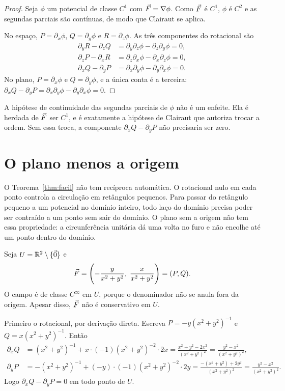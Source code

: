 \documentclass[11pt,a4paper]{article}
\begin{document}
\begin{proof}
Seja $\phi$ um potencial de classe $C^1$ com $\vec{F}=\nabla\phi$. Como $\vec{F}$ é $C^1$, $\phi$ é $C^2$ e as segundas parciais são contínuas, de modo que Clairaut se aplica.

No espaço, $P=\partial_x\phi$, $Q=\partial_y\phi$ e $R=\partial_z\phi$. As três componentes do rotacional são
\begin{align*}
\partial_y R-\partial_z Q
&=\partial_y\partial_z\phi-\partial_z\partial_y\phi=0,\\
\partial_z P-\partial_x R
&=\partial_z\partial_x\phi-\partial_x\partial_z\phi=0,\\
\partial_x Q-\partial_y P
&=\partial_x\partial_y\phi-\partial_y\partial_x\phi=0.
\end{align*}
No plano, $P=\partial_x\phi$ e $Q=\partial_y\phi$, e a única conta é a terceira: $\partial_x Q-\partial_y P=\partial_x\partial_y\phi-\partial_y\partial_x\phi=0$.
\end{proof}

A hipótese de continuidade das segundas parciais de $\phi$ não é um enfeite. Ela é herdada de $\vec{F}$ ser $C^1$, e é exatamente a hipótese de Clairaut que autoriza trocar a ordem. Sem essa troca, a componente $\partial_x Q-\partial_y P$ não precisaria ser zero.

\section{O plano menos a origem}

O Teorema~\ref{thm:facil} não tem recíproca automática. O rotacional nulo em cada ponto controla a circulação em retângulos pequenos. Para passar do retângulo pequeno a um potencial no domínio inteiro, todo laço do domínio precisa poder ser contraído a um ponto sem sair do domínio. O plano sem a origem não tem essa propriedade: a circunferência unitária dá uma volta no furo e não encolhe até um ponto dentro do domínio.

\begin{contraexemplo}
\label{ex:angular}
Seja $U=\mathbb{R}^2\setminus\{\vec{0}\}$ e
\[
\vec{F}
=\Biggl(-\frac{y}{x^2+y^2},\;\frac{x}{x^2+y^2}\Biggr)
=(P,Q).
\]
O campo é de classe $C^\infty$ em $U$, porque o denominador não se anula fora da origem. Apesar disso, $\vec{F}$ não é conservativo em $U$.
\end{contraexemplo}

Primeiro o rotacional, por derivação direta. Escreva $P=-y(x^2+y^2)^{-1}$ e $Q=x(x^2+y^2)^{-1}$. Então
\begin{align*}
\partial_x Q
&=(x^2+y^2)^{-1}+x\cdot(-1)(x^2+y^2)^{-2}\cdot 2x
=\frac{x^2+y^2-2x^2}{(x^2+y^2)^2}
=\frac{y^2-x^2}{(x^2+y^2)^2},\\[0.4em]
\partial_y P
&=-(x^2+y^2)^{-1}+(-y)\cdot(-1)(x^2+y^2)^{-2}\cdot 2y
=\frac{-(x^2+y^2)+2y^2}{(x^2+y^2)^2}
=\frac{y^2-x^2}{(x^2+y^2)^2}.
\end{align*}
Logo $\partial_x Q-\partial_y P=0$ em todo ponto de $U$.
\end{document}
